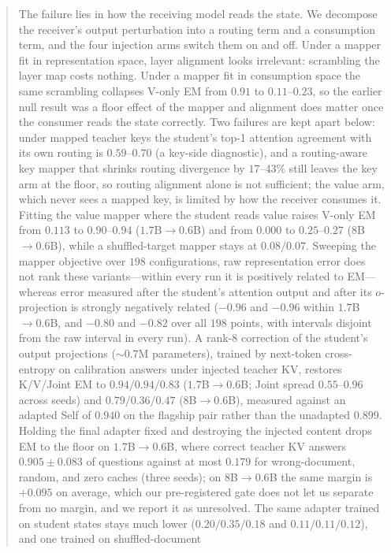 \documentclass[11pt]{article}
\begin{document}
\begin{abstract}
The failure lies in how the receiving model reads the state. We decompose the
receiver's output perturbation into a routing term and a consumption term, and
the four injection arms switch them on and off. Under a mapper fit
in representation space, layer alignment looks irrelevant: scrambling the layer
map costs nothing. Under a mapper fit in consumption space the same scrambling
collapses V-only EM from $0.91$ to $0.11$--$0.23$, so the earlier null result was
a floor effect of the mapper and alignment does matter once the consumer reads
the state correctly. Two failures are kept apart below: under mapped teacher keys
the student's top-1 attention agreement with its own routing is $0.59$--$0.70$
(a key-side diagnostic), and a routing-aware key mapper that shrinks routing
divergence by $17$--$43\%$ still leaves the key arm at the floor, so routing
alignment alone is not sufficient; the value arm, which never sees a
mapped key, is limited by how the receiver consumes it. Fitting the value mapper
where the student reads value raises V-only EM from $0.113$ to $0.90$--$0.94$
($1.7$B$\to0.6$B) and from $0.000$ to $0.25$--$0.27$ ($8$B$\to0.6$B), while a
shuffled-target mapper stays at $0.08/0.07$. Sweeping the mapper objective over
$198$ configurations, raw representation error does not rank these variants---within
every run it is positively related to EM---whereas error measured after the
student's attention output and after its $o$-projection is strongly negatively
related ($-0.96$ and $-0.96$ within $1.7$B$\to0.6$B, and $-0.80$ and $-0.82$ over
all $198$ points, with intervals disjoint from the raw interval in every run). A
rank-8 correction of the
student's output projections ($\sim$$0.7$M parameters), trained by next-token
cross-entropy on calibration answers under injected teacher KV, restores
K/V/Joint EM to $0.94/0.94/0.83$
($1.7$B$\to0.6$B; Joint spread $0.55$--$0.96$ across seeds) and
$0.79/0.36/0.47$ ($8$B$\to0.6$B), measured against an adapted Self of $0.940$ on
the flagship pair rather than the unadapted $0.899$. Holding the final adapter
fixed and destroying the injected content drops EM to the floor on
$1.7$B$\to0.6$B, where correct teacher KV answers $0.905\pm0.083$ of questions
against at most $0.179$ for wrong-document, random, and zero caches (three
seeds); on $8$B$\to0.6$B the same margin is $+0.095$ on average, which our
pre-registered gate does not let us separate from no margin, and we report it as
unresolved. The same adapter trained on student states stays much lower
($0.20/0.35/0.18$ and $0.11/0.11/0.12$), and one trained on shuffled-document
$$
\end{abstract}
\end{document}

